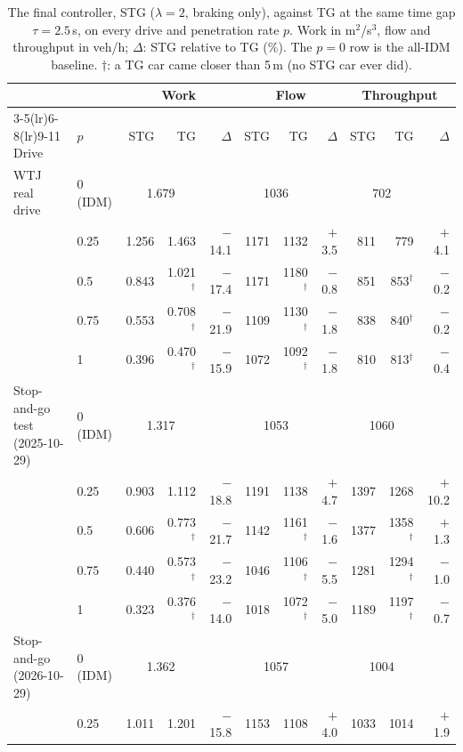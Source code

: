 \begin{table}[htbp]
\centering
\scriptsize
\caption{The final controller, STG ($\lambda=2$, braking only), against TG at the same time gap $\tau=2.5$\,s, on every drive and penetration rate $p$. Work in m$^2$/s$^3$, flow and throughput in veh/h; $\Delta$: STG relative to TG (\%). The $p=0$ row is the all-IDM baseline. $\dagger$: a TG car came closer than 5\,m (no STG car ever did).}
\label{tab:final-tau2.5}
\begin{tabular}{llrrrrrrrrr}
\toprule
 & & \multicolumn{3}{c}{Work} & \multicolumn{3}{c}{Flow} & \multicolumn{3}{c}{Throughput} \\
\cmidrule(lr){3-5}\cmidrule(lr){6-8}\cmidrule(lr){9-11}
Drive & $p$ & STG & TG & $\Delta$ & STG & TG & $\Delta$ & STG & TG & $\Delta$ \\
\midrule
WTJ real drive & 0 (IDM) & \multicolumn{2}{c}{1.679} & & \multicolumn{2}{c}{1036} & & \multicolumn{2}{c}{702} & \\
 & 0.25 & 1.256 & 1.463 & $-$14.1 & 1171 & 1132 & $+$3.5 & 811 & 779 & $+$4.1 \\
 & 0.5 & 0.843 & 1.021$^\dagger$ & $-$17.4 & 1171 & 1180$^\dagger$ & $-$0.8 & 851 & 853$^\dagger$ & $-$0.2 \\
 & 0.75 & 0.553 & 0.708$^\dagger$ & $-$21.9 & 1109 & 1130$^\dagger$ & $-$1.8 & 838 & 840$^\dagger$ & $-$0.2 \\
 & 1 & 0.396 & 0.470$^\dagger$ & $-$15.9 & 1072 & 1092$^\dagger$ & $-$1.8 & 810 & 813$^\dagger$ & $-$0.4 \\
\midrule
Stop-and-go test (2025-10-29) & 0 (IDM) & \multicolumn{2}{c}{1.317} & & \multicolumn{2}{c}{1053} & & \multicolumn{2}{c}{1060} & \\
 & 0.25 & 0.903 & 1.112 & $-$18.8 & 1191 & 1138 & $+$4.7 & 1397 & 1268 & $+$10.2 \\
 & 0.5 & 0.606 & 0.773$^\dagger$ & $-$21.7 & 1142 & 1161$^\dagger$ & $-$1.6 & 1377 & 1358$^\dagger$ & $+$1.3 \\
 & 0.75 & 0.440 & 0.573$^\dagger$ & $-$23.2 & 1046 & 1106$^\dagger$ & $-$5.5 & 1281 & 1294$^\dagger$ & $-$1.0 \\
 & 1 & 0.323 & 0.376$^\dagger$ & $-$14.0 & 1018 & 1072$^\dagger$ & $-$5.0 & 1189 & 1197$^\dagger$ & $-$0.7 \\
\midrule
Stop-and-go (2026-10-29) & 0 (IDM) & \multicolumn{2}{c}{1.362} & & \multicolumn{2}{c}{1057} & & \multicolumn{2}{c}{1004} & \\
 & 0.25 & 1.011 & 1.201 & $-$15.8 & 1153 & 1108 & $+$4.0 & 1033 & 1014 & $+$1.9 \\

\end{tabular}
\end{table}
